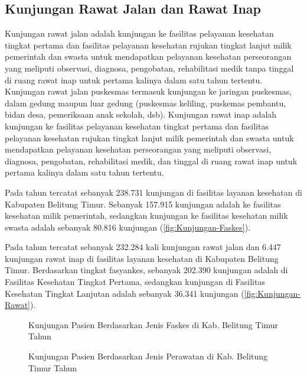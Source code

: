 \subsection{Kunjungan Rawat Jalan dan Rawat Inap}
Kunjungan rawat jalan adalah kunjungan ke fasilitas pelayanan kesehatan tingkat pertama dan fasilitas pelayanan kesehatan rujukan tingkat lanjut milik pemerintah dan swasta untuk mendapatkan pelayanan kesehatan perseorangan yang meliputi observasi, diagnosa, pengobatan, rehabilitasi medik tanpa tinggal di ruang rawat inap untuk pertama kalinya dalam satu tahun tertentu. Kunjungan rawat jalan puskesmas termasuk kunjungan ke jaringan puskesmas, dalam gedung maupun luar gedung (puskesmas keliling, puskemas pembantu, bidan desa, pemeriksaan anak sekolah, dsb).
Kunjungan rawat inap adalah kunjungan ke fasilitas pelayanan kesehatan tingkat pertama dan fasilitas pelayanan kesehatan rujukan tingkat lanjut milik pemerintah dan swasta untuk mendapatkan pelayanan kesehatan perseorangan yang meliputi observasi, diagnosa, pengobatan, rehabilitasi medik, dan tinggal di ruang rawat inap untuk pertama kalinya dalam satu tahun tertentu.

Pada tahun \tP tercatat sebanyak 238.731 kunjungan di fasilitas layanan kesehatan di Kabupaten Belitung Timur. Sebanyak 157.915 kunjungan adalah ke fasilitas kesehatan milik pemerintah, sedangkan kunjungan ke fasilitas kesehatan milik swasta adalah sebanyak 80.816 kunjungan (\autoref{fig:Kunjungan-Faskes}).

Pada tahun \tP tercatat sebanyak 232.284 kali kunjungan rawat jalan dan 6.447 kunjungan rawat inap di fasilitas layanan kesehatan di Kabupaten Belitung Timur. Berdasarkan tingkat fasyankes, sebanyak 202.390 kunjungan adalah di Fasilitas Kesehatan Tingkat Pertama, sedangkan kunjungan di Fasilitas Kesehatan Tingkat Lanjutan adalah sebanyak 36.341 kunjungan (\autoref{fig:Kunjungan-Rawat}).

\begin{figure}[!htb]
    \centering{}
    \caption{Kunjungan Pasien Berdasarkan Jenis Faskes di Kab. Belitung Timur Tahun \tP}
    \label{fig:Kunjungan-Faskes}
\end{figure}

\begin{figure}[!htb]
    \centering{}
    \caption{Kunjungan Pasien Berdasarkan Jenis Perawatan di Kab. Belitung Timur Tahun \tP}
    \label{fig:Kunjungan-Rawat}
\end{figure}

